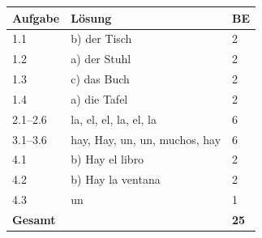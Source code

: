 \documentclass[11pt,a4paper]{article}
\begin{document}
\vspace{0.5cm}

\begin{tcolorbox}[colback=white, colframe=loesung, title=\textbf{Erwartungshorizont (Kurzform)}]
\begin{tabular}{|l|l|l|}
\hline
\textbf{Aufgabe} & \textbf{Lösung} & \textbf{BE} \\
\hline
1.1 & b) der Tisch & 2 \\
1.2 & a) der Stuhl & 2 \\
1.3 & c) das Buch & 2 \\
1.4 & a) die Tafel & 2 \\
\hline
2.1--2.6 & la, el, el, la, el, la & 6 \\
\hline
3.1--3.6 & hay, Hay, un, un, muchos, hay & 6 \\
\hline
4.1 & b) Hay el libro & 2 \\
4.2 & b) Hay la ventana & 2 \\
4.3 & un & 1 \\
\hline
\textbf{Gesamt} & & \textbf{25} \\
\hline
\end{tabular}
\end{tcolorbox}
\end{document}
